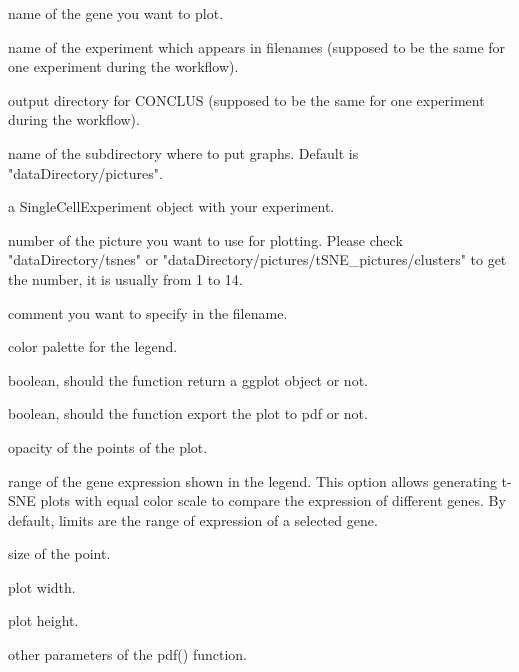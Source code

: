 \documentclass[a4paper]{book}
\begin{document}
\begin{Arguments}
\begin{ldescription}
\item[\code{geneName}] name of the gene you want to plot.

\item[\code{experimentName}] name of the experiment which appears in filenames (supposed to be the same for one experiment during the workflow).

\item[\code{dataDirectory}] output directory for CONCLUS (supposed to be the same for one experiment during the workflow).

\item[\code{graphsDirectory}] name of the subdirectory where to put graphs. Default is "dataDirectory/pictures".

\item[\code{sceObject}] a SingleCellExperiment object with your experiment.

\item[\code{tSNEpicture}] number of the picture you want to use for plotting. 
Please check "dataDirectory/tsnes" or "dataDirectory/pictures/tSNE\_pictures/clusters" to get the number, it is usually from 1 to 14.

\item[\code{commentName}] comment you want to specify in the filename.

\item[\code{palette}] color palette for the legend.

\item[\code{returnPlot}] boolean, should the function return a ggplot object or not.

\item[\code{savePlot}] boolean, should the function export the plot to pdf or not.

\item[\code{alpha}] opacity of the points of the plot.

\item[\code{limits}] range of the gene expression shown in the legend.
This option allows generating t-SNE plots with equal color
scale to compare the expression of different genes. By default, limits are the range
of expression of a selected gene.

\item[\code{pointSize}] size of the point.

\item[\code{width}] plot width.

\item[\code{height}] plot height.

\item[\code{...}] other parameters of the pdf() function.
\end{ldescription}
\end{Arguments}
\end{document}
